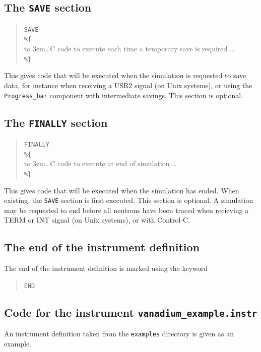 \subsection{The \texttt{SAVE} section}
\label{s:save}

\begin{quote}
  \texttt{SAVE} \\
  \verb|%{| \\
  \hbox to 3em{}\ldots C code to execute each time a temporary save is required \ldots \\
  \verb|%}|
\end{quote} 
This gives code that will be executed when the simulation is requested to save data, for instance when receiving a USR2 signal (on Unix systems), or using the \verb+Progress_bar+ component with intermediate savings. This section is optional.

\subsection{The \texttt{FINALLY} section}
\label{s:finally}

\begin{quote}
  \texttt{FINALLY} \\
  \verb|%{| \\
  \hbox to 3em{}\ldots C code to execute at end of simulation \ldots \\
  \verb|%}|
\end{quote}
This gives code that will be executed when the simulation has
ended. When existing, the \texttt{SAVE} section is first executed. This section is optional.
A simulation may be requested to end before all neutrons have been traced when recieving a TERM or INT signal (on Unix systems), or with Control-C.
 


\subsection{The end of the instrument definition}
\label{s:end}

The end of the instrument definition is marked using the keyword
\begin{quote}
  \texttt{END}
\end{quote}

\subsection{Code for the instrument \texttt{vanadium\_example.instr}}
\label{s:vanadium_example.instr}
An instrument definition taken from the \texttt{examples} directory is
given as an example.

